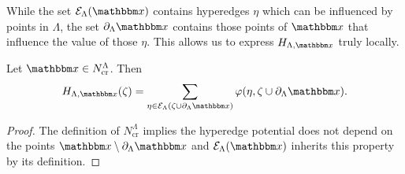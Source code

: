 While the set $\mathcal E_\Lambda(\x)$ contains hyperedges $\eta$ which can be influenced by points in $\Lambda$, the set $\partial_\Lambda \x$  contains those points of $\x$ that influence the value of those $\eta$. This allows us to express $H_{\Lambda,\x}$ truly locally.

\begin{proposition}\label{prop:Hcr}Let $\x\in N^\Lambda_\text{cr}$. Then 
	$$H_{\Lambda,\x}(\zeta) = \sum_{\eta \in \mathcal E_\Lambda(\zeta \cup \partial_\Lambda \x)} \varphi(\eta, \zeta \cup \partial_\Lambda \x).$$
\end{proposition}
\begin{proof} The definition of $N^\Lambda_\text{cr}$ implies the hyperedge potential does not depend on the points $\x \setminus \partial_\Lambda \x$ and $\mathcal E_\Lambda(\x)$ inherits this property by its definition.
\end{proof}




